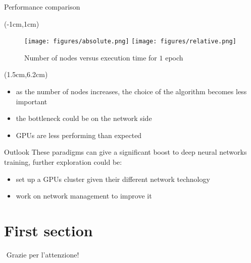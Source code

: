 \documentclass{beamer}
\begin{document}
\begin{frame}{Performance comparison}
 \begin{textblock*}{15cm}(-1cm,1cm)
  \begin{figure}[h]
   \texttt{[image: figures/absolute.png]}
   \texttt{[image: figures/relative.png]}
   \caption{Number of nodes versus execution time for $1$ epoch}
   \label{1}
  \end{figure}
 \end{textblock*}
 
 \begin{textblock*}{10cm}(1.5cm,6.2cm)
  \begin{itemize}
   \item as the number of nodes increases, the choice of the algorithm becomes less important
   \item the bottleneck could be on the network side
   \item GPUs are less performing than expected
  \end{itemize}
 \end{textblock*}
\end{frame}

\begin{frame}{Outlook}
 These paradigms can give a significant boost to deep neural networks
 training, further exploration could be:
 \begin{itemize}
  \item set up a GPUs cluster given their different network technology
  \item work on network management to improve it
 \end{itemize}
\end{frame}

\section{First section}

\begin{frame}{$ $ }
 \centering
 \Huge Grazie per l'attenzione!
\end{frame}
\end{document}
